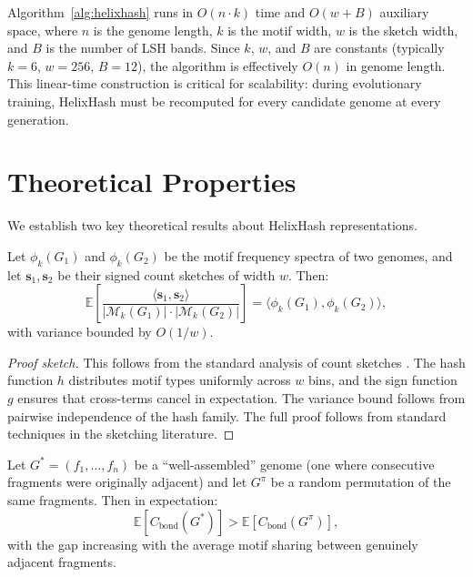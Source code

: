 \begin{dogmadef}
Algorithm~\ref{alg:helixhash} runs in $O(n \cdot k)$ time and $O(w + B)$ auxiliary space, where $n$ is the genome length, $k$ is the motif width, $w$ is the sketch width, and $B$ is the number of LSH bands. Since $k$, $w$, and $B$ are constants (typically $k = 6$, $w = 256$, $B = 12$), the algorithm is effectively $O(n)$ in genome length. This linear-time construction is critical for scalability: during evolutionary training, HelixHash must be recomputed for every candidate genome at every generation.
\end{dogmadef}

\section{Theoretical Properties}
\label{sec:helixhash-theory}

We establish two key theoretical results about HelixHash representations.

\begin{theorem}
\label{thm:sketch-approx}
Let $\phi_k(G_1)$ and $\phi_k(G_2)$ be the motif frequency spectra of two genomes, and let $\mathbf{s}_1, \mathbf{s}_2$ be their signed count sketches of width $w$. Then:
\begin{equation}
\mathbb{E}\left[\frac{\langle \mathbf{s}_1, \mathbf{s}_2 \rangle}{|\mathcal{M}_k(G_1)| \cdot |\mathcal{M}_k(G_2)|}\right] = \langle \phi_k(G_1), \phi_k(G_2) \rangle,
\end{equation}
with variance bounded by $O(1/w)$.
\end{theorem}

\begin{proof}[Proof sketch]
This follows from the standard analysis of count sketches \citep{charikar2002}. The hash function $h$ distributes motif types uniformly across $w$ bins, and the sign function $g$ ensures that cross-terms cancel in expectation. The variance bound follows from pairwise independence of the hash family. The full proof follows from standard techniques in the sketching literature.
\end{proof}

\begin{theorem}
\label{thm:bond-assembly}
Let $G^* = (f_1, \ldots, f_n)$ be a ``well-assembled'' genome (one where consecutive fragments were originally adjacent) and let $G^{\pi}$ be a random permutation of the same fragments. Then in expectation:
\begin{equation}
\mathbb{E}[C_{\mathrm{bond}}(G^*)] > \mathbb{E}[C_{\mathrm{bond}}(G^{\pi})],
\end{equation}
with the gap increasing with the average motif sharing between genuinely adjacent fragments.
\end{theorem}

